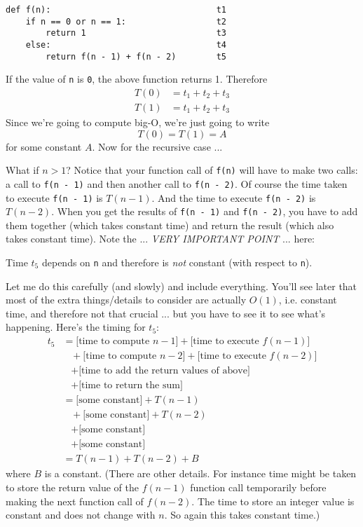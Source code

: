 \begin{Verbatim}[frame=single,fontsize=\footnotesize]
def f(n):                                 t1
    if n == 0 or n == 1:                  t2
        return 1                          t3
    else:                                 t4 
        return f(n - 1) + f(n - 2)        t5
\end{Verbatim}

If the value of \verb!n! is \verb!0!, the above function returns 1.
Therefore
\begin{align*}
T(0) &= t_1 + t_2 + t_3 \\
T(1) &= t_1 + t_2 + t_3
\end{align*}
Since we're going to compute big-O, 
we're just going to write
\[
T(0) = T(1) = A
\]
for some constant $A$.
Now for the recursive case ...

What if $n > 1$?
Notice that your function call of \verb!f(n)! will have to make two calls:
a call to \verb!f(n - 1)! and then another call to \verb!f(n - 2)!.
Of course the time taken to execute \verb!f(n - 1)! is $T(n - 1)$.
And the time to execute 
\verb!f(n - 2)! is $T(n - 2)$.
When you get the results of \verb!f(n - 1)! and \verb!f(n - 2)!,
you have to add them together (which takes constant time)
and return the result (which also takes constant time).
Note the ... \textit{VERY IMPORTANT POINT} ... here:

Time $t_5$ depends on \verb!n! and therefore is \textit{not}
constant (with respect to \verb!n!).

Let me do this carefully (and slowly) and include everything.
You'll see later that most of the extra things/details to consider
are actually $O(1)$, i.e. constant time, and therefore 
not that crucial ... but you have to see it to see what's
happening. 
Here's the timing for $t_5$:
\begin{align*}
t_5 
&= \text{[time to compute $n - 1$]} + \text{[time to execute $f(n - 1)$]} \\
&\,\,\,\,\,  + \text{[time to compute $n - 2$]} + \text{[time to execute $f(n - 2)$]} \\
&\,\,\,\,\,  + \text{[time to add the return values of above]} \\
&\,\,\,\,\,  + \text{[time to return the sum]} \\
&= \text{[some constant]} + T(n-1) \\
&\,\,\,\,\,  + \text{[some constant]} + T(n-2) \\
&\,\,\,\,\,  + \text{[some constant]} \\
&\,\,\,\,\,  + \text{[some constant]} \\
&= T(n-1) + T(n-2) + B
\end{align*}
where $B$ is a constant.
(There are other details.
For instance time might be taken to store
the return value of the $f(n - 1)$ function call temporarily
before making the next function call of $f(n-2)$.
The time to store an integer value is constant and does not
change with $n$. 
So again this takes constant time.)

